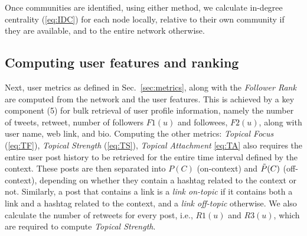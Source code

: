 %



Once communities are identified, using either method, we calculate  in-degree centrality (\ref{eq:IDC}) for each node locally, relative to their own community if they are available, and to the entire network otherwise.

\subsection{Computing user features and ranking} \label{sec:features}

Next, user metrics as defined in Sec.~\ref{sec:metrics}, along with the \textit{Follower Rank} are computed from the network and the user features.
%
This is achieved by a key component (5) for bulk retrieval of user profile information, namely the number of tweets, retweet,  number of followers $F1(u)$ and followees, $F2(u)$, along with user name, web link, and bio.
%
Computing the other metrics: \textit{Topical Focus} (\ref{eq:TF}), \textit{Topical Strength} (\ref{eq:TS}), \textit{Topical Attachment} \ref{eq:TA} also requires the entire user post history to be retrieved for the entire time interval defined by the context.
These posts are then separated into $P(C)$ (on-context) and $\Tilde{P}(C)$ (off-context), depending on whether they contain a hashtag related to the context or not.
Similarly, a post that contains a link is a \textit{link on-topic} if it contains both a link and a hashtag related to the context, and a \textit{link off-topic} otherwise.
We also calculate the number of retweets for every post, i.e., $\mathit{R1}(u)$ and $\mathit{R3}(u)$, which are required to compute \textit{Topical Strength}.

